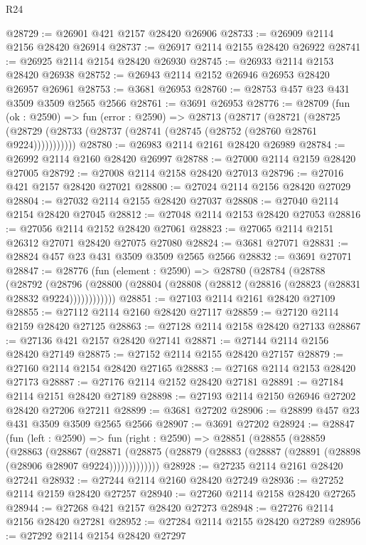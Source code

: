 \begin{lexlean}{R24}
\begin{coremodule}
@28729 := @26901 @421 @2157 @28420 @26906
@28733 := @26909 @2114 @2156 @28420 @26914
@28737 := @26917 @2114 @2155 @28420 @26922
@28741 := @26925 @2114 @2154 @28420 @26930
@28745 := @26933 @2114 @2153 @28420 @26938
@28752 := @26943 @2114 @2152 @26946 @26953 @28420 @26957 @26961
@28753 := @3681 @26953
@28760 := @28753 @457 @23 @431 @3509 @3509 @2565 @2566
@28761 := @3691 @26953
@28776 := @28709
    (fun (ok : @2590) =>
    fun (error : @2590) =>
    @28713
      (@28717
        (@28721
          (@28725 (@28729 (@28733 (@28737 (@28741 (@28745 (@28752 (@28760 @28761 @9224)))))))))))
@28780 := @26983 @2114 @2161 @28420 @26989
@28784 := @26992 @2114 @2160 @28420 @26997
@28788 := @27000 @2114 @2159 @28420 @27005
@28792 := @27008 @2114 @2158 @28420 @27013
@28796 := @27016 @421 @2157 @28420 @27021
@28800 := @27024 @2114 @2156 @28420 @27029
@28804 := @27032 @2114 @2155 @28420 @27037
@28808 := @27040 @2114 @2154 @28420 @27045
@28812 := @27048 @2114 @2153 @28420 @27053
@28816 := @27056 @2114 @2152 @28420 @27061
@28823 := @27065 @2114 @2151 @26312 @27071 @28420 @27075 @27080
@28824 := @3681 @27071
@28831 := @28824 @457 @23 @431 @3509 @3509 @2565 @2566
@28832 := @3691 @27071
@28847 := @28776
    (fun (element : @2590) =>
    @28780
      (@28784
        (@28788
          (@28792
            (@28796 (@28800 (@28804 (@28808 (@28812 (@28816 (@28823 (@28831 @28832 @9224))))))))))))
@28851 := @27103 @2114 @2161 @28420 @27109
@28855 := @27112 @2114 @2160 @28420 @27117
@28859 := @27120 @2114 @2159 @28420 @27125
@28863 := @27128 @2114 @2158 @28420 @27133
@28867 := @27136 @421 @2157 @28420 @27141
@28871 := @27144 @2114 @2156 @28420 @27149
@28875 := @27152 @2114 @2155 @28420 @27157
@28879 := @27160 @2114 @2154 @28420 @27165
@28883 := @27168 @2114 @2153 @28420 @27173
@28887 := @27176 @2114 @2152 @28420 @27181
@28891 := @27184 @2114 @2151 @28420 @27189
@28898 := @27193 @2114 @2150 @26946 @27202 @28420 @27206 @27211
@28899 := @3681 @27202
@28906 := @28899 @457 @23 @431 @3509 @3509 @2565 @2566
@28907 := @3691 @27202
@28924 := @28847
    (fun (left : @2590) =>
    fun (right : @2590) =>
    @28851
      (@28855
        (@28859
          (@28863
            (@28867
              (@28871
                (@28875 (@28879 (@28883 (@28887 (@28891 (@28898 (@28906 @28907 @9224)))))))))))))
@28928 := @27235 @2114 @2161 @28420 @27241
@28932 := @27244 @2114 @2160 @28420 @27249
@28936 := @27252 @2114 @2159 @28420 @27257
@28940 := @27260 @2114 @2158 @28420 @27265
@28944 := @27268 @421 @2157 @28420 @27273
@28948 := @27276 @2114 @2156 @28420 @27281
@28952 := @27284 @2114 @2155 @28420 @27289
@28956 := @27292 @2114 @2154 @28420 @27297

\end{coremodule}
\end{lexlean}
